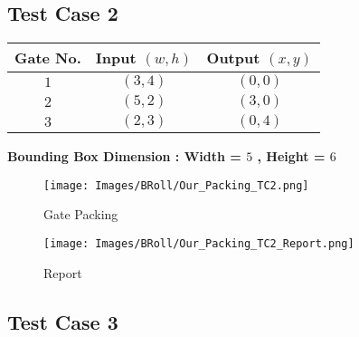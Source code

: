 \documentclass[12pt, a4paper,openany]{article}
\begin{document}
\subsection{Test Case 2}
\begin{center}
\begin{tabular}{|c|c|c|}
    \hline
    \rowcolor[HTML]{DAE8FC} Gate No. &
    Input \((w,h)\)                                    & Output \((x,y)\)   \\ \hline
    \rowcolor[HTML]{FFFC9E} {\color[HTML]{000000}\(1\)} &
    {\color[HTML]{000000}\((3,4)\)}                         & {\color[HTML]{000000}\((0,0)\)}    \\ \hline
    \rowcolor[HTML]{FFFC9E} 
    {\color[HTML]{000000} \(2\)} &
    {\color[HTML]{000000}\((5,2)\)}                         & {\color[HTML]{000000}\((3,0)\)}      \\ \hline
     \rowcolor[HTML]{FFFC9E} 
     {\color[HTML]{000000} \(3\)} &
    {\color[HTML]{000000}\((2,3)\)}                         & {\color[HTML]{000000}\((0,4)\)}      \\ \hline
    
\end{tabular}
\end{center}
\begin{center}
\textbf{Bounding Box Dimension : Width = \(5\) , Height = \(6\)}   
\end{center}
\begin{figure}[ht]
    \centering
    \begin{minipage}{.6\textwidth}
          \centering
          \texttt{[image: Images/BRoll/Our\_Packing\_TC2.png]}
          \label{fig:tc-2}
          \caption{Gate Packing }
     
          \texttt{[image: Images/BRoll/Our\_Packing\_TC2\_Report.png]}
          \label{fig:tcr-2}
          \caption{Report}
    \end{minipage}
\end{figure}

    
\newpage
\subsection{Test Case 3}
\end{document}
